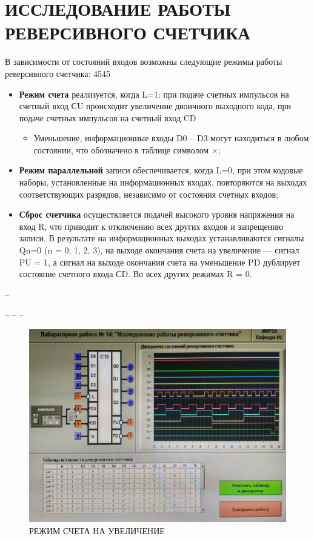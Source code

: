 \section{ИССЛЕДОВАНИЕ РАБОТЫ РЕВЕРСИВНОГО СЧЕТЧИКА}

В зависимости от состояний входов возможны следующие режимы
работы реверсивного счетчика:
4545
\begin{itemize}
	\item \textbf{Режим счета} реализуется, когда L=1: при подаче счетных
	импульсов на счетный вход СU происходит увеличение двоичного
	выходного кода, при подаче счетных импульсов на счетный вход CD
	
	\begin{itemize}
		\item Уменьшение, информационные входы D0 – D3 могут находиться в
		любом состоянии, что обозначено в таблице символом ×;
	\end{itemize}

		\item \textbf{Режим параллельной} записи обеспечивается,
		когда L=0, при этом кодовые наборы, установленные на
		информационных входах, повторяются на выходах соответствующих
		разрядов, независимо от состояния счетных входов;
	
		\item \textbf{Сброс счетчика} осуществляется подачей высокого уровня
		напряжения на вход R, что приводит к отключению всех других
		входов и запрещению записи. В результате на информационных
		выходах устанавливаются сигналы Qn=0 (n = 0, 1, 2, 3), на выходе
		окончания счета на увеличение — сигнал PU = 1, а сигнал на выходе
		окончания счета на уменьшение PD дублирует состояние счетного
		входа СD. Во всех других режимах R = 0.


\end{itemize}
– 

– 
– 
– 

\begin{figure}[H]
	\centering
	\includegraphics[width=0.95\linewidth]{imgs/14/1.jpg}
	\caption{РЕЖИМ СЧЕТА НА УВЕЛИЧЕНИЕ}
	\label{fig:14_1}
\end{figure}

